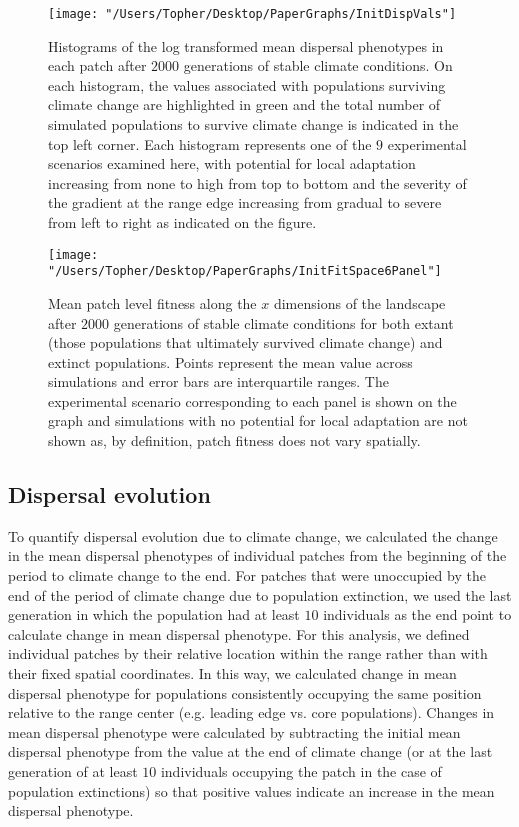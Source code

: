 \documentclass[11pt, oneside]{article}
\begin{document}
\begin{figure}
\centering
\texttt{[image: "/Users/Topher/Desktop/PaperGraphs/InitDispVals"]}
\vspace{-5mm}
\caption[LoF entry]{Histograms of the log transformed mean dispersal phenotypes in each patch after $2000$ generations of stable climate conditions. On each histogram, the values associated with populations surviving climate change are highlighted in green and the total number of simulated populations to survive climate change is indicated in the top left corner. Each histogram represents one of the $9$ experimental scenarios examined here, with potential for local adaptation increasing from none to high from top to bottom and the severity of the gradient at the range edge increasing from gradual to severe from left to right as indicated on the figure.}
\label{fig:InitDisp}
\end{figure}

\begin{figure}
\centering
\texttt{[image: "/Users/Topher/Desktop/PaperGraphs/InitFitSpace6Panel"]}
\vspace{-5mm}
\caption[LoF entry]{Mean patch level fitness along the $x$ dimensions of the landscape after $2000$ generations of stable climate conditions for both extant (those populations that ultimately survived climate change) and extinct populations. Points represent the mean value across simulations and error bars are interquartile ranges. The experimental scenario corresponding to each panel is shown on the graph and simulations with no potential for local adaptation are not shown as, by definition, patch fitness does not vary spatially.}
\label{fig:InitFit}
\end{figure}

\subsection{Dispersal evolution}
To quantify dispersal evolution due to climate change, we calculated the change in the mean dispersal phenotypes of individual patches from the beginning of the period to climate change to the end. For patches that were unoccupied by the end of the period of climate change due to population extinction, we used the last generation in which the population had at least $10$ individuals as the end point to calculate change in mean dispersal phenotype. For this analysis, we defined individual patches by their relative location within the range rather than with their fixed spatial coordinates. In this way, we calculated change in mean dispersal phenotype for populations consistently occupying the same position relative to the range center (e.g. leading edge vs. core populations). Changes in mean dispersal phenotype were calculated by subtracting the initial mean dispersal phenotype from the value at the end of climate change (or at the last generation of at least $10$ individuals occupying the patch in the case of population extinctions) so that positive values indicate an increase in the mean dispersal phenotype.
\end{document}
